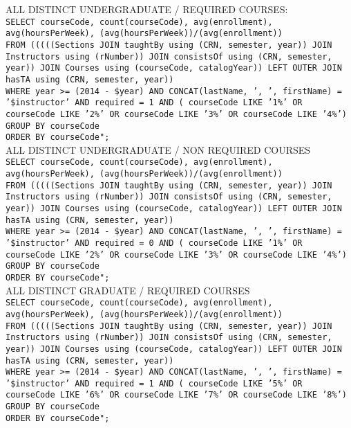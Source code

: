 \begin{enumerate}
\begin{enumerate}
					
			ALL DISTINCT UNDERGRADUATE / REQUIRED COURSES:\\
        	\texttt{SELECT courseCode, count(courseCode), avg(enrollment), avg(hoursPerWeek), (avg(hoursPerWeek))/(avg(enrollment))\\
					FROM (((((Sections JOIN taughtBy using (CRN, semester, year)) JOIN Instructors using (rNumber)) JOIN consistsOf using (CRN, semester, year)) JOIN Courses using (courseCode, catalogYear)) LEFT OUTER JOIN hasTA using (CRN, semester, year))\\
					WHERE year >= (2014 - \$year) AND CONCAT(lastName, ', ', firstName) = '\$instructor' AND required = 1 AND ( courseCode LIKE '1\%' OR courseCode LIKE '2\%' OR courseCode LIKE '3\%' OR courseCode LIKE '4\%')\\
					GROUP BY courseCode\\
					ORDER BY courseCode";}\\
					
			ALL DISTINCT UNDERGRADUATE / NON REQUIRED COURSES\\
        	\texttt{SELECT courseCode, count(courseCode), avg(enrollment), avg(hoursPerWeek), (avg(hoursPerWeek))/(avg(enrollment))\\
					FROM (((((Sections JOIN taughtBy using (CRN, semester, year)) JOIN Instructors using (rNumber)) JOIN consistsOf using (CRN, semester, year)) JOIN Courses using (courseCode, catalogYear)) LEFT OUTER JOIN hasTA using (CRN, semester, year))\\
					WHERE year >= (2014 - \$year) AND CONCAT(lastName, ', ', firstName) = '\$instructor' AND required = 0 AND ( courseCode LIKE '1\%' OR courseCode LIKE '2\%' OR courseCode LIKE '3\%' OR courseCode LIKE '4\%')\\
					GROUP BY courseCode\\
					ORDER BY courseCode";}\\
					
			ALL DISTINCT GRADUATE / REQUIRED COURSES\\	
			\texttt{SELECT courseCode, count(courseCode), avg(enrollment), avg(hoursPerWeek), (avg(hoursPerWeek))/(avg(enrollment))\\
					FROM (((((Sections JOIN taughtBy using (CRN, semester, year)) JOIN Instructors using (rNumber)) JOIN consistsOf using (CRN, semester, year)) JOIN Courses using (courseCode, catalogYear)) LEFT OUTER JOIN hasTA using (CRN, semester, year))\\
					WHERE year >= (2014 - \$year) AND CONCAT(lastName, ', ', firstName) = '\$instructor' AND required = 1 AND ( courseCode LIKE '5\%' OR courseCode LIKE '6\%' OR courseCode LIKE '7\%' OR courseCode LIKE '8\%')\\
					GROUP BY courseCode\\
					ORDER BY courseCode";}\\
					

\end{enumerate}
\end{enumerate}
